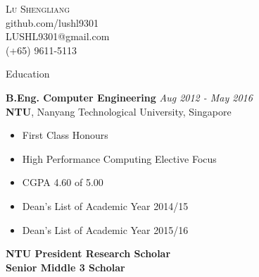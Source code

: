 \documentclass[a4paper, 12pt]{article}
\newenvironment{changemargin}[2]{%
  \begin{list}{}{%
      \setlength{\topsep}{0pt}%
      \setlength{\leftmargin}{#1}%
      \setlength{\rightmargin}{#2}%
      \setlength{\listparindent}{\parindent}%
      \setlength{\itemindent}{\parindent}%
      \setlength{\parsep}{\parskip}%
    }%
  \item[]}{\end{list}
}
\newcommand{\lineover}{
  \begin{changemargin}{-0.05in}{-0.05in}
    \vspace*{-8pt}
    \hrulefill \\
    \vspace*{-2pt}
  \end{changemargin}
}
\newcommand{\header}[1]{
  \begin{changemargin}{-0.6in}{-0.6in}
    \fontsize{15}{15}\scshape{#1}\\
    \lineover
    \vspace*{-4pt}
  \end{changemargin}
}
\newcommand{\contact}[5]{
  \begin{changemargin}{-0.5in}{-0.5in}
    \begin{center}
      {\LARGE \scshape {#1}}\\ \smallskip
      {#2}\\ \smallskip
      {#3}\\ \smallskip
      {#4}   \smallskip
    \end{center}
  \end{changemargin}
}
\newenvironment{body}
{
\vspace*{-16pt}
\begin{changemargin}{-0.25in}{-0.5in}
}
{
\end{changemargin}
}
\begin{document}
\contact{Lu Shengliang}{github.com/lushl9301}{LUSHL9301@gmail.com}{(+65) 9611-5113}





\header{Education}
\begin{body}
  \vspace{14pt}
  \textbf{B.Eng. Computer Engineering} \hfill \emph{Aug 2012 - May 2016} \\
  \textbf{NTU}, Nanyang Technological University, Singapore\\
  \begin{itemize} \itemsep -0pt  \small
  \vspace*{-4pt}
  \item First Class Honours
  \item High Performance Computing Elective Focus
  \item CGPA 4.60 of 5.00
  \item Dean's List of Academic Year 2014/15
  \item Dean's List of Academic Year 2015/16
  \end{itemize}
  \textbf{NTU President Research Scholar}\\
  \smallskip
  \textbf{Senior Middle 3 Scholar}

\end{body}
\end{document}
